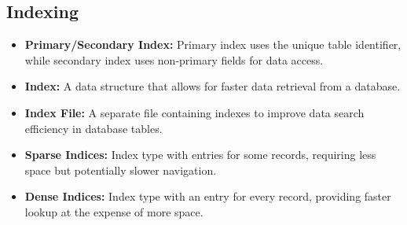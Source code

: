 \vspace{-0.3cm}
\subsection*{Indexing}
\vspace{-0.1cm}

\begin{itemize}[noitemsep,leftmargin=*] 
\leftskip-\dimexpr\leftmargin %
\item[]{\textbf{Primary/Secondary Index:} Primary index uses the unique table identifier, while secondary index uses non-primary fields for data access.}
\item[]{\textbf{Index:} A data structure that allows for faster data retrieval from a database.}
\item[]{\textbf{Index File:} A separate file containing indexes to improve data search efficiency in database tables.}
\item[]{\textbf{Sparse Indices:} Index type with entries for some records, requiring less space but potentially slower navigation.}
\item[]{\textbf{Dense Indices:} Index type with an entry for every record, providing faster lookup at the expense of more space.}
\end{itemize}
